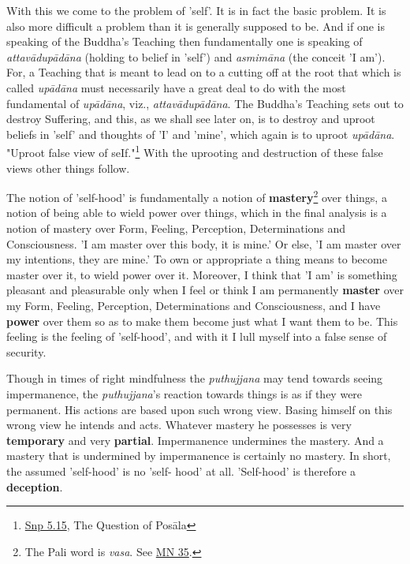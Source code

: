 With this we come to the problem of 'self'. It is in fact the basic
problem. It is also more difficult a problem than it is generally
supposed to be. And if one is speaking of the Buddha’s Teaching then
fundamentally one is speaking of \emph{attavādupādāna} (holding to belief in
'self') and \emph{asmimāna} (the conceit 'I am'). For, a Teaching that is
meant to lead on to a cutting off at the root that which is called
\emph{upādāna} must necessarily have a great deal to do with the most
fundamental of \emph{upādāna}, viz., \emph{attavādupādāna}. The Buddha’s
Teaching sets out to destroy Suffering, and this, as we shall see later
on, is to destroy and uproot beliefs in 'self' and thoughts of 'I' and
'mine', which again is to uproot \emph{upādāna}. "Uproot false view of
seIf."\footnote{\href{https://suttacentral.net/snp5.15/en/sujato}{Snp 5.15}, The Question of Posāla}
With the uprooting and destruction of these false views other things follow.


The notion of 'self-hood' is fundamentally a notion of
\textbf{mastery}\footnote{The Pali word is \emph{vasa}. See \href{https://suttacentral.net/mn35/en/sujato}{MN 35}.}
over things, a notion of being able to wield power over things, which in
the final analysis is a notion of mastery over Form, Feeling,
Perception, Determinations and Consciousness. 'I am master over this
body, it is mine.' Or else, 'I am master over my intentions, they are
mine.' To own or appropriate a thing means to become master over it, to
wield power over it. Moreover, I think that 'I am' is something pleasant
and pleasurable only when I feel or think I am permanently \textbf{master} over
my Form, Feeling, Perception, Determinations and Consciousness, and I
have \textbf{power} over them so as to make them become just what I want them to
be. This feeling is the feeling of 'self-hood', and with it I lull
myself into a false sense of security.


Though in times of right mindfulness the \emph{puthujjana} may tend towards
seeing impermanence, the \emph{puthujjana}'s reaction towards things is as
if they were permanent. His actions are based upon such wrong view.
Basing himself on this wrong view he intends and acts. Whatever mastery
he possesses is very \textbf{temporary} and very \textbf{partial}. Impermanence
undermines the mastery. And a mastery that is undermined by impermanence
is certainly no mastery. In short, the assumed 'self-hood' is no 'self-
hood' at all. 'Self-hood' is therefore a \textbf{deception}.


